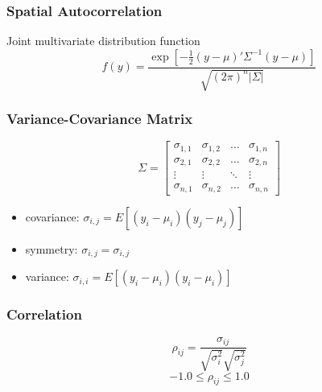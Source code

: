\documentclass[nototal]{beamer}
\begin{document}
\begin{frame}
    \frametitle{Spatial Autocorrelation}
    \begin{block}{Joint multivariate distribution function}
      \begin{equation}
f(y) = \frac{ \exp\left[
-\frac{1}{2}
(y-\mu)'
\Sigma^{-1}
(y-\mu)
\right]} 
{\sqrt{(2\pi)^n|\Sigma|}}
      \end{equation}
  \end{block}
    \end{frame}


\begin{frame}
    \frametitle{Variance-Covariance Matrix}
    \begin{equation}
\Sigma=
\left[
\begin{array}{rrrr}
\sigma_{1,1}&\sigma_{1,2}&\ldots&\sigma_{1,n}\\
\sigma_{2,1}&\sigma_{2,2}&\ldots&\sigma_{2,n}\\
\vdots&\vdots&\ddots&\vdots\\
\sigma_{n,1}&\sigma_{n,2}&\ldots&\sigma_{n,n}
\end{array}
\right]
    \end{equation}
    \begin{itemize}
      \item covariance: $\sigma_{i,j} = E[(y_i - \mu_i)(y_j-\mu_j)      ]$
      \item symmetry:  $\sigma_{i,j} =\sigma_{i,j}$
      \item variance: $\sigma_{i,i} = E[(y_i - \mu_i)(y_i-\mu_i)      ]$
    \end{itemize}
    \end{frame}


\begin{frame}
    \frametitle{Correlation}
    \begin{equation}
      \rho_{ij} = \frac{\sigma_{ij}}{\sqrt{\sigma_{i}^2}\sqrt{\sigma_{j}^2}}
    \end{equation}
    \begin{equation}
    -1.0 \le \rho_{ij} \le 1.0
    \end{equation}
    \end{frame}
\end{document}

